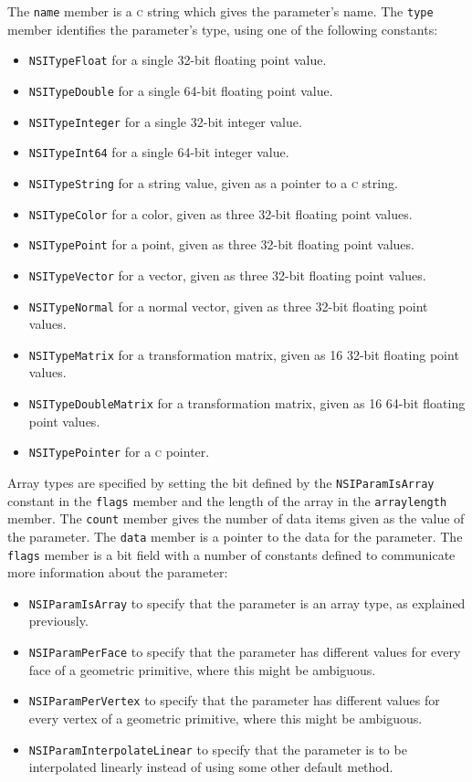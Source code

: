 \documentclass[oneside,ebook]{memoir}
\newcommand*{\acronym}[1]{\textsc{\lowercase{#1}}}
\begin{document}
The \lstinline|name| member is a \acronym{C} string which gives the parameter's name. The \lstinline|type| member identifies the parameter's type, using one of the following constants:
\firmlists
\begin{itemize}
	\item \lstinline|NSITypeFloat| for a single 32-bit floating point value.
	\item \lstinline|NSITypeDouble| for a single 64-bit floating point value.
	\item \lstinline|NSITypeInteger| for a single 32-bit integer value.
	\item \lstinline|NSITypeInt64| for a single 64-bit integer value.
	\item \lstinline|NSITypeString| for a string value, given as a pointer to a \acronym{C} string.
	\item \lstinline|NSITypeColor| for a color, given as three 32-bit floating point values.
	\item \lstinline|NSITypePoint| for a point, given as three 32-bit floating point values.
	\item \lstinline|NSITypeVector| for a vector, given as three 32-bit floating point values.
	\item \lstinline|NSITypeNormal| for a normal vector, given as three 32-bit floating point values.
	\item \lstinline|NSITypeMatrix| for a transformation matrix, given as 16 32-bit floating point values.
	\item \lstinline|NSITypeDoubleMatrix| for a transformation matrix, given as 16 64-bit floating point values.
	\item \lstinline|NSITypePointer| for a \acronym{C} pointer.
\end{itemize}
Array types are specified by setting the bit defined by the \lstinline|NSIParamIsArray| constant in the \lstinline|flags| member and the length of the array in the \lstinline|arraylength| member.
The \lstinline|count| member gives the number of data items given as the value of the parameter.
The \lstinline|data| member is a pointer to the data for the parameter.
The \lstinline|flags| member is a bit field with a number of constants defined to communicate more information about the parameter:
\label{Interface:parameterflags}
\firmlists
\begin{itemize}
	\item \lstinline|NSIParamIsArray| to specify that the parameter is an array type, as explained previously.
	\item \lstinline|NSIParamPerFace| to specify that the parameter has different values for every face of a geometric primitive, where this might be ambiguous.
	\item \lstinline|NSIParamPerVertex| to specify that the parameter has different values for every vertex of a geometric primitive, where this might be ambiguous.
	\item \lstinline|NSIParamInterpolateLinear| to specify that the parameter is to be interpolated linearly instead of using some other default method.
\end{itemize}
\end{document}

